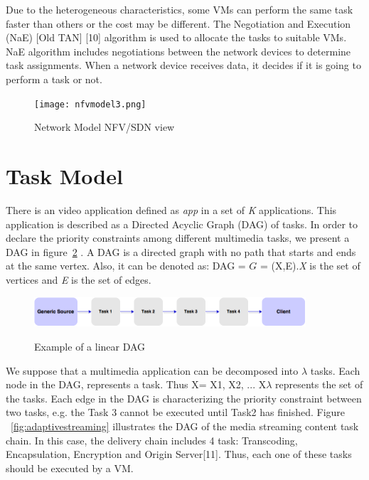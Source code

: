 \documentclass[a4paper]{article}
\begin{document}
Due to the heterogeneous characteristics, some VMs can perform the same task faster than others or the cost may be different. The Negotiation and Execution (NaE) [Old TAN] [10] algorithm is used to allocate the tasks to suitable VMs. NaE algorithm includes negotiations between the network devices to determine task assignments. When a network device receives data, it decides if it is going to perform a task or not. \\

\begin{figure}[!ht]
  \caption{Network Model NFV/SDN view}
  \centering
    \texttt{[image: nfvmodel3.png]}
    \label{fig:networkmodelnfvsdn}
\end{figure}

\section{Task Model}
There is an video application defined as \textit{app} in a set of \textit{K} applications. This application is described as a Directed Acyclic Graph (DAG) of tasks. In order to declare the priority constraints among different multimedia tasks, we present a DAG in figure~\ref{fig:generictasks} . A DAG is a directed graph with no path that starts and ends at the same vertex. Also, it can be denoted as: DAG = $G$ = (X,E).\textit{X} is the set of vertices and \textit{E} is the set of edges. 

\begin{figure}[!ht]
  \caption{Example of a linear DAG}
  \centering
    \includegraphics[width=0.9\textwidth]{generic_tasks2.png}
    \label{fig:generictasks}
\end{figure}

We suppose that a multimedia application can be decomposed into $\lambda$ tasks. Each node in the DAG, represents a task. 
Thus X= {X1, X2, ... X$\lambda$} represents the set of the tasks. Each edge in the DAG is characterizing the priority constraint between two tasks, e.g. the Task 3 cannot be executed until Task2 has finished. Figure ~\ref{fig:adaptivestreaming} illustrates the DAG of the media streaming content task chain. In this case, the delivery chain includes 4 task: Transcoding, Encapsulation, Encryption and Origin Server[11]. Thus, each one of these tasks should be executed by a VM.
\end{document}
